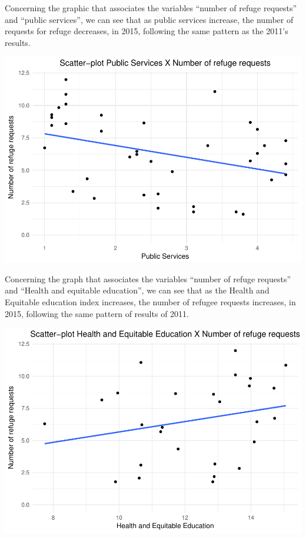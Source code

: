 \documentclass[]{elsarticle} %
\makeatletter
\def\maxwidth{\ifdim\Gin@nat@width>\linewidth\linewidth
\else\Gin@nat@width\fi}
\let\Oldincludegraphics\includegraphics
\renewcommand{\includegraphics}[1]{\Oldincludegraphics[width=\maxwidth]{#1}}
\makeatother
\begin{document}
Concerning the graphic that associates the variables ``number of refuge
requests'' and ``public services'', we can see that as public services
increase, the number of requests for refuge decreases, in 2015,
following the same pattern as the 2011's results.

\includegraphics{stephanie-moura-rmarkdown-tf-ad-ufpe-2018_files/figure-latex/model_1_3-1.pdf}

Concerning the graph that associates the variables ``number of refuge
requests'' and ``Health and equitable education'', we can see that as
the Health and Equitable education index increases, the number of
refugee requests increases, in 2015, following the same pattern of
results of 2011.

\includegraphics{stephanie-moura-rmarkdown-tf-ad-ufpe-2018_files/figure-latex/model_1_4-1.pdf}
\end{document}
